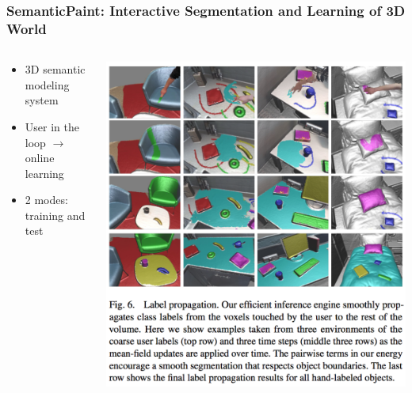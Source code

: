 {
	\frametitle{SemanticPaint: Interactive Segmentation and Learning of 3D World}
	
	\begin{minipage}[0.2\textheight]{\textwidth}
		\begin{columns}[T]
			\begin{column}{0.5\textwidth}
				
				\begin{itemize}
					\item 3D semantic modeling system
					\item User in the loop $\rightarrow$ online learning
					\item 2 modes: training and test
				\end{itemize}
			\end{column}
			\begin{column}{0.4\textwidth}
				\includegraphics[width=\textwidth]{img/semanticpaint/labelpropagation.png}
			\end{column}
		\end{columns}
	\end{minipage}
}

